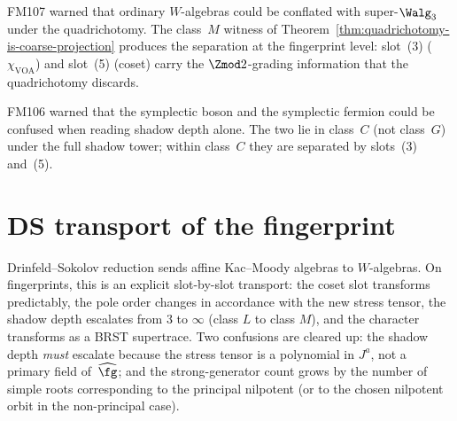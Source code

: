\begin{remark}
\label{rem:fm107-closure}
FM\textup{107} warned that ordinary $W$-algebras could be conflated
with super-$\Walg_3$ under the quadrichotomy. The class~$M$ witness
of Theorem~\ref{thm:quadrichotomy-is-coarse-projection}
produces the separation at the fingerprint level: slot~(3)
($\chi_{\mathrm{VOA}}$) and slot~(5) (coset) carry the
$\Zmod 2$-grading information that the quadrichotomy discards.
\end{remark}

\begin{remark}
\label{rem:fm106-closure}
FM\textup{106} warned that the symplectic boson and the symplectic
fermion could be confused when reading shadow depth alone. The two
lie in class~$C$ (not class~$G$) under the full shadow tower;
within class~$C$ they are separated by slots~(3) and~(5).
\end{remark}

\section{DS transport of the fingerprint}
\label{sec:DS-transport}

Drinfeld--Sokolov reduction sends affine Kac--Moody algebras to
$W$-algebras. On fingerprints, this is an explicit slot-by-slot
transport: the coset slot transforms predictably, the pole order
changes in accordance with the new stress tensor, the shadow depth
escalates from $3$ to $\infty$ (class $L$ to class $M$), and the
character transforms as a BRST supertrace. Two confusions are cleared
up: the shadow depth \emph{must} escalate because the stress tensor
is a polynomial in $J^a$, not a primary field of~$\widehat\fg$; and
the strong-generator count grows by the number of simple roots
corresponding to the principal nilpotent (or to the chosen nilpotent
orbit in the non-principal case).

